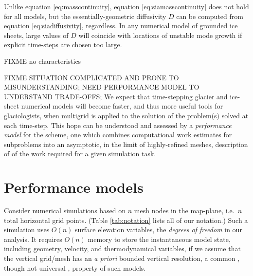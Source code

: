 \documentclass[twocolumn,letterpaper]{igs}
\begin{document}
Unlike equation \eqref{eq:masscontinuity}, equation \eqref{eq:siamasscontinuity} does not hold for all models, but the essentially-geometric diffusivity $D$ can be computed from equation \eqref{eq:siadiffusivity}, regardless.  In any numerical model of grounded ice sheets, large values of $D$ will coincide with locations of unstable mode growth if explicit time-steps are chosen too large.

FIXME no characteristics

FIXME SITUATION COMPLICATED AND PRONE TO MISUNDERSTANDING; NEED PERFORMANCE MODEL TO UNDERSTAND TRADE-OFFS; We expect that time-stepping glacier and ice-sheet numerical models will become faster, and thus more useful tools for glaciologists, when multigrid is applied to the solution of the problem(s) solved at each time-step.  This hope can be understood and assessed by a \emph{performance model} for the scheme, one which combines computational work estimates for subproblems into an asymptotic, in the limit of highly-refined meshes, description of of the work required for a given simulation task.

\section{Performance models}

Consider numerical simulations based on $n$ mesh nodes in the map-plane, i.e.~$n$ total horizontal grid points.  (Table \ref{tab:notation} lists all of our notation.)  Such a simulation uses $O(n)$ surface elevation variables, the \emph{degrees of freedom} in our analysis.  It requires $O(n)$ memory to store the instantaneous model state, including geometry, velocity, and thermodynamical variables, if we assume that the vertical grid/mesh has an \emph{a priori} bounded vertical resolution, a common \citep[for example]{Brinkerhoffetal2017,Hoffmanetal2018}, though not universal \citep{IsaacStadlerGhattas2015}, property of such models.
\end{document}
